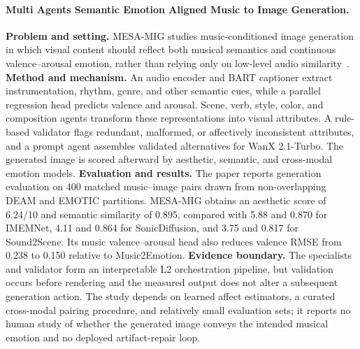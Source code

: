 \paragraph{Multi Agents Semantic Emotion Aligned Music to Image Generation.}
\textbf{Problem and setting.} MESA-MIG studies music-conditioned image generation in which visual content should reflect both musical semantics and continuous valence--arousal emotion, rather than relying only on low-level audio similarity~\cite{avg251223320}. \textbf{Method and mechanism.} An audio encoder and BART captioner extract instrumentation, rhythm, genre, and other semantic cues, while a parallel regression head predicts valence and arousal. Scene, verb, style, color, and composition agents transform these representations into visual attributes. A rule-based validator flags redundant, malformed, or affectively inconsistent attributes, and a prompt agent assembles validated alternatives for WanX 2.1-Turbo. The generated image is scored afterward by aesthetic, semantic, and cross-modal emotion models. \textbf{Evaluation and results.} The paper reports generation evaluation on 400 matched music--image pairs drawn from non-overlapping DEAM and EMOTIC partitions. MESA-MIG obtains an aesthetic score of 6.24/10 and semantic similarity of 0.895, compared with 5.88 and 0.870 for IMEMNet, 4.11 and 0.864 for SonicDiffusion, and 3.75 and 0.817 for Sound2Scene. Its music valence--arousal head also reduces valence RMSE from 0.238 to 0.150 relative to Music2Emotion. \textbf{Evidence boundary.} The specialists and validator form an interpretable L2 orchestration pipeline, but validation occurs before rendering and the measured output does not alter a subsequent generation action. The study depends on learned affect estimators, a curated cross-modal pairing procedure, and relatively small evaluation sets; it reports no human study of whether the generated image conveys the intended musical emotion and no deployed artifact-repair loop.


